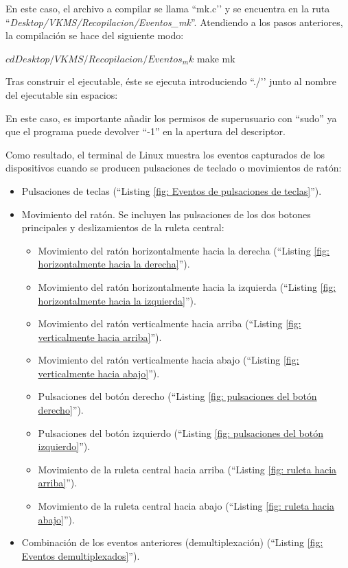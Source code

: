 En este caso, el archivo a compilar se llama ``mk.c’’ y se encuentra en la ruta ``{\itshape Desktop/VKMS/Recopilacion/Eventos\_mk}''. Atendiendo a los pasos anteriores, la compilación se hace del siguiente modo: \\

\begin{bashcode}
$ cd Desktop/VKMS/Recopilacion/Eventos_mk
$ make mk
\end{bashcode}

Tras construir el ejecutable, éste se ejecuta introduciendo ``./’’ junto al nombre del ejecutable sin espacios: \\


En este caso, es importante añadir los permisos de superusuario con ``sudo'' ya que el programa puede devolver ``-1'' en la apertura del descriptor.

Como resultado, el terminal de Linux muestra los eventos capturados de los dispositivos cuando se producen pulsaciones de teclado o movimientos de ratón: 

\begin{itemize}
    \item Pulsaciones de teclas (``Listing \ref{fig: Eventos de pulsaciones de teclas}'').
    \item Movimiento del ratón. Se incluyen las pulsaciones de los dos botones principales y deslizamientos de la ruleta central:
    \begin{itemize}
        \item Movimiento del ratón horizontalmente hacia la derecha (``Listing \ref{fig: horizontalmente hacia la derecha}'').
        \item Movimiento del ratón horizontalmente hacia la izquierda (``Listing \ref{fig: horizontalmente hacia la izquierda}'').
        \item Movimiento del ratón verticalmente hacia arriba (``Listing \ref{fig: verticalmente hacia arriba}'').
        \item Movimiento del ratón verticalmente hacia abajo (``Listing \ref{fig: verticalmente hacia abajo}'').
        \item Pulsaciones del botón derecho (``Listing \ref{fig: pulsaciones del botón derecho}'').
        \item Pulsaciones del botón izquierdo (``Listing \ref{fig: pulsaciones del botón izquierdo}'').
        \item Movimiento de la ruleta central hacia arriba (``Listing \ref{fig: ruleta hacia arriba}'').
        \item Movimiento de la ruleta central hacia abajo (``Listing \ref{fig: ruleta hacia abajo}'').
    \end{itemize}
    \item Combinación de los eventos anteriores (demultiplexación) (``Listing \ref{fig: Eventos demultiplexados}'').\\
\end{itemize}

